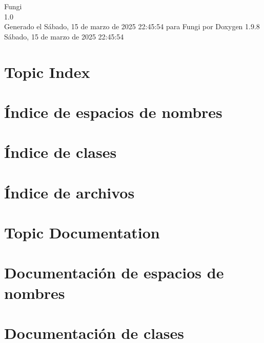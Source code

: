 \documentclass[twoside]{book}
\newcommand{\+}{\discretionary{\mbox{\scriptsize$\hookleftarrow$}}{}{}}
\newcommand{\clearemptydoublepage}{%
    \newpage{\pagestyle{empty}\cleardoublepage}%
  }
\begin{document}
  \raggedbottom
    \hypersetup{pageanchor=false,
                bookmarksnumbered=true,
                pdfencoding=unicode
               }
  \begin{titlepage}
  \vspace*{7cm}
  \begin{center}%
  {\Large Fungi}\\
  [1ex]\large 1.\+0 \\
  \vspace*{1cm}
  {\large Generado el Sábado, 15 de marzo de 2025 22\+:45\+:54 para Fungi por Doxygen 1.9.8}\\
    \vspace*{0.5cm}
    {\small Sábado, 15 de marzo de 2025 22:45:54}
  \end{center}
  \end{titlepage}
  \clearemptydoublepage
  \tableofcontents
  \clearemptydoublepage
  \hypersetup{pageanchor=true}

\chapter{Topic Index}

\chapter{Índice de espacios de nombres}

\chapter{Índice de clases}

\chapter{Índice de archivos}

\chapter{Topic Documentation}

\chapter{Documentación de espacios de nombres}



\chapter{Documentación de clases}










\end{document}
